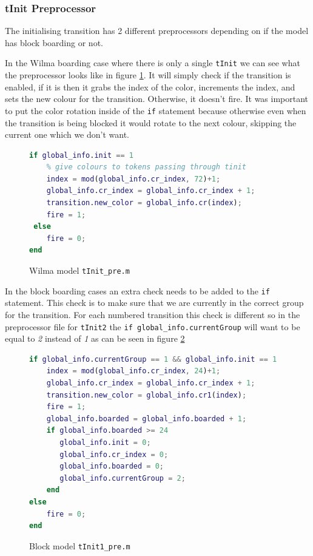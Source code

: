 \documentclass[english]{article}
\begin{document}
\subsubsection{tInit Preprocessor}
The initialising transition has 2 different preprocessors depending on if the model has block boarding or not. 

In the Wilma boarding case where there is only a single \lstinline{tInit} we can see what the preprocessor looks like in figure \ref{fig:tinit_pre_wilma}. It will simply check if the transition is enabled, if it is then it grabs the index of the color, increments the index, and sets the new colour for the transition. Otherwise, it doesn't fire. It was important to put the color rotation inside of the \lstinline{if} statement because otherwise even when the transition is being blocked it would rotate to the next colour, skipping the current one which we don't want.

\begin{figure}[H]
    \centering
\begin{lstlisting}[language=MATLAB]
if global_info.init == 1
    % give colours to tokens passing through tinit
    index = mod(global_info.cr_index, 72)+1;
    global_info.cr_index = global_info.cr_index + 1;
    transition.new_color = global_info.cr(index);
    fire = 1;
 else
    fire = 0;
end
\end{lstlisting}
    \caption{Wilma model \lstinline{tInit_pre.m}}
    \label{fig:tinit_pre_wilma}
\end{figure}

In the block boarding cases an extra check needs to be added to the \lstinline{if} statement. This check is to make sure that we are currently in the correct group for the transition. For each numbered transition this check is different so in the preprocessor file for \lstinline{tInit2} the \lstinline{if global_info.currentGroup} will want to be equal to \emph{2} instead of \emph{1} as can be seen in figure \ref{fig:tinit_pre_block}

\begin{figure}[H]
    \centering
\begin{lstlisting}[language=MATLAB]
if global_info.currentGroup == 1 && global_info.init == 1
    index = mod(global_info.cr_index, 24)+1;
    global_info.cr_index = global_info.cr_index + 1;
    transition.new_color = global_info.cr1(index);
    fire = 1;
    global_info.boarded = global_info.boarded + 1;
    if global_info.boarded >= 24
       global_info.init = 0;
       global_info.cr_index = 0;
       global_info.boarded = 0;
       global_info.currentGroup = 2;  
    end
else
    fire = 0;
end
\end{lstlisting}
    \caption{Block model \lstinline{tInit1_pre.m}}
    \label{fig:tinit_pre_block}
\end{figure}
\end{document}
